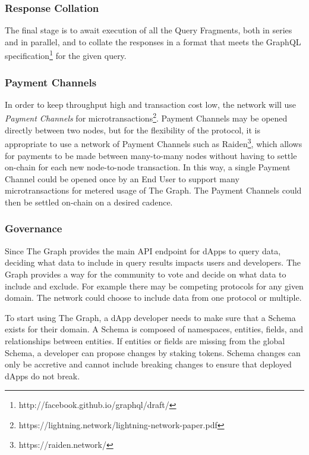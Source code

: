 \documentclass[12pt]{article}
\begin{document}
\subsubsection*{Response Collation}

The final stage is to await execution of all the Query Fragments, both in series
and in parallel, and to collate the responses in a format that meets the GraphQL
specification\footnote{http://facebook.github.io/graphql/draft/} for the given
query.

\subsubsection*{Payment Channels}

In order to keep throughput high and transaction cost low, the network will use
\textit{Payment Channels} for
microtransactions\footnote{https://lightning.network/lightning-network-paper.pdf}.
Payment Channels may be opened directly between two nodes, but for the
flexibility of the protocol, it is appropriate to use a network of Payment
Channels such as Raiden\footnote{https://raiden.network/}, which allows for
payments to be made between many-to-many nodes without having to settle on-chain
for each new node-to-node transaction. In this way, a single Payment Channel
could be opened once by an End User to support many microtransactions for
metered usage of The Graph. The Payment Channels could then be settled on-chain
on a desired cadence.

\subsubsection*{Governance}

Since The Graph provides the main API endpoint for dApps to query data, deciding
what data to include in query results impacts users and developers. The Graph
provides a way for the community to vote and decide on what data to include and
exclude. For example there may be competing protocols for any given domain. The
network could choose to include data from one protocol or multiple.

To start using The Graph, a dApp developer needs to make sure that a Schema
exists for their domain. A Schema is composed of namespaces, entities, fields,
and relationships between entities. If entities or fields are missing from the
global Schema, a developer can propose changes by staking tokens. Schema changes
can only be accretive and cannot include breaking changes to ensure that
deployed dApps do not break.
\end{document}
